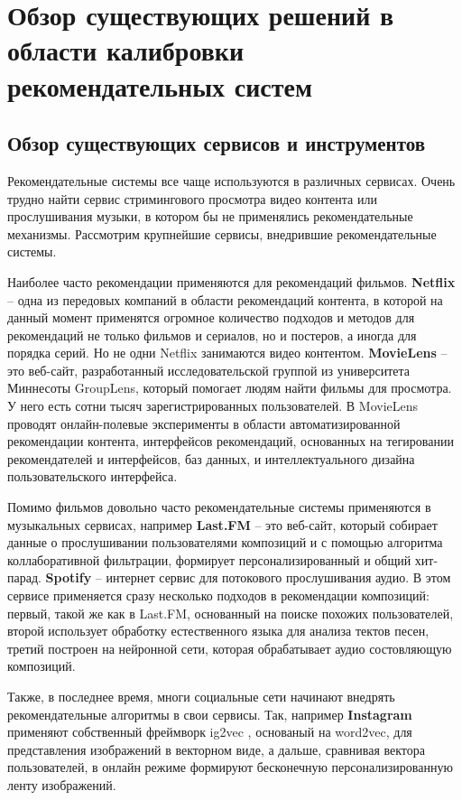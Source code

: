 \section{Обзор существующих решений в области калибровки рекомендательных систем}
\subsection{Обзор существующих сервисов и инструментов}
Рекомендательные системы все чаще используются в различных сервисах. 
Очень трудно найти сервис стримингового просмотра видео контента или 
прослушивания музыки, в котором бы не применялись рекомендательные 
механизмы. Рассмотрим крупнейшие сервисы, внедрившие рекомендательные
системы.

Наиболее часто рекомендации применяются для рекомендаций фильмов. 
\textbf{Netflix} -- одна из передовых компаний в области рекомендаций контента,
в которой на данный момент применятся огромное количество подходов и методов
для рекомендаций не только фильмов и сериалов, но и постеров, а иногда
для порядка серий. Но не одни Netflix занимаются видео контентом. 
\textbf{MovieLens} -- это веб-сайт, разработанный исследовательской группой
из университета Миннесоты GroupLens, который помогает людям найти фильмы
 для просмотра. У него есть сотни тысяч зарегистрированных 
 пользователей. В MovieLens проводят онлайн-полевые эксперименты в области автоматизированной рекомендации контента, 
  интерфейсов рекомендаций, основанных на тегировании рекомендателей
   и интерфейсов, баз данных, и 
   интеллектуального дизайна пользовательского интерфейса.

  Помимо фильмов довольно часто рекомендательные системы применяются
  в музыкальных сервисах, например \textbf{Last.FM} -- это веб-сайт, 
  который собирает данные о прослушивании пользователями композиций и
  с помощью алгоритма коллаборативной фильтрации,
  формирует персонализированный и общий хит-парад. 
  \textbf{Spotify} -- интернет сервис для потокового 
  прослушивания аудио. В этом сервисе применяется сразу несколько
  подходов в рекомендации композиций: первый, такой же как в Last.FM,
  основанный на поиске похожих пользователей, второй использует 
  обработку естественного языка для анализа тектов песен, третий
  построен на нейронной сети, которая обрабатывает аудио состовляющую композиций.

  Также, в последнее время, многи социальные сети начинают внедрять
  рекомендательные алгоритмы в свои сервисы. Так, например \textbf{Instagram}
  применяют собственный фреймворк ig2vec \cite{ig2vec}, основаный на 
  word2vec, для представления изображений в векторном виде, а дальше, 
  сравнивая вектора пользователей, в онлайн режиме формируют бесконечную
  персонализированную ленту изображений.

